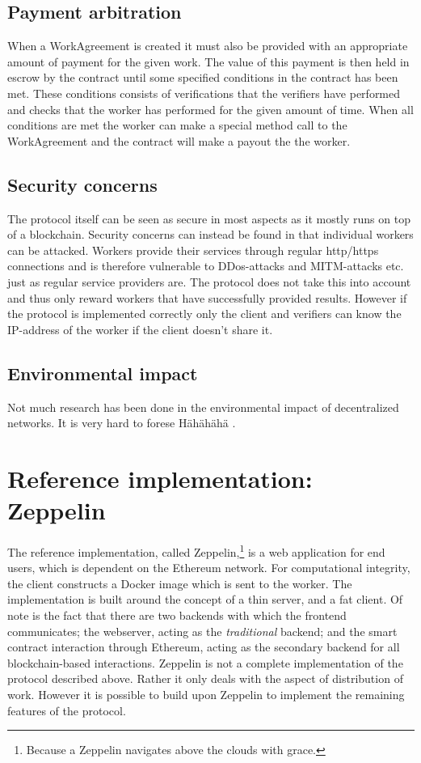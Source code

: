 \subsection{Payment arbitration}
When a WorkAgreement is created it must also be provided with an appropriate amount of payment for the given work. The value of this payment is then held in escrow by the contract until some specified conditions in the contract has been met. These conditions consists of verifications that the verifiers have performed and checks that the worker has performed for the given amount of time. When all conditions are met the worker can make a special method call to the WorkAgreement and the contract will make a payout the the worker.

\subsection{Security concerns}
The protocol itself can be seen as secure in most aspects as it mostly runs on top of a blockchain. Security concerns can instead be found in that individual workers can be attacked. Workers provide their services through regular http/https connections and is therefore vulnerable to DDos-attacks and MITM-attacks etc. just as regular service providers are. The protocol does not take this into account and thus only reward workers that have successfully provided results. However if the protocol is implemented correctly only the client and verifiers can know the IP-address of the worker if the client doesn't share it.

\subsection{Environmental impact}
Not much research has been done in the environmental impact of decentralized networks. It is very hard to forese  
Hähähähä \cite{cook}.

\section{Reference implementation: Zeppelin}
The reference implementation, called Zeppelin,\footnote{Because a Zeppelin navigates above the clouds with grace.} is a web application for end users, which is dependent on the Ethereum network. For computational integrity, the client constructs a Docker image which is sent to the worker. The implementation is built around the concept of a thin server, and a fat client. Of note is the fact that there are two backends with which the frontend communicates; the webserver, acting as the \textit{traditional} backend; and the smart contract interaction through Ethereum, acting as the secondary backend for all blockchain-based interactions. Zeppelin is not a complete implementation of the protocol described above. Rather it only deals with the aspect of distribution of work. However it is possible to build upon Zeppelin to implement the remaining features of the protocol.

